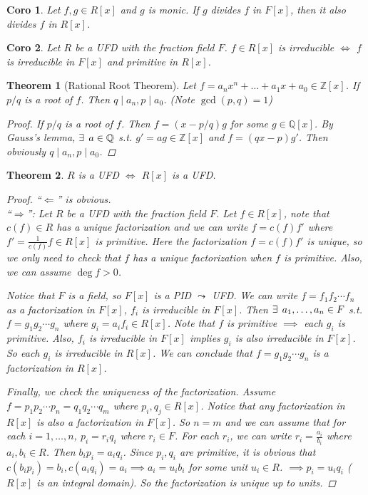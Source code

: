 \documentclass[a4paper]{article}
\let\existstemp\exists
\renewcommand*{\exists}{\existstemp\mkern4mu}
\newcommand{\Zb}{\mathbb{Z}}
\newcommand{\Qb}{\mathbb{Q}}
\theoremstyle{mystyle}
\newtheorem{theorem}{Theorem}
\newtheorem{coro}{Coro}
\begin{document}
\begin{coro}
  Let $f, g \in R[x]$ and $g$ is monic. If $g$ divides $f$ in $F[x]$, then
  it also divides $f$ in $R[x]$.
\end{coro}

\begin{coro}
  Let $R$ be a UFD with the fraction field $F$. $f \in R[x]$
  is irreducible $\iff$ $f$ is irreducible in $F[x]$ and primitive in $R[x]$.
\end{coro}

\begin{theorem}[Rational Root Theorem]
  Let $f = a_n x^n + \dots + a_1 x + a_0 \in \Zb[x]$.
  If $p/q$ is a root of $f$. Then $q \mid a_n, p \mid a_0$.
  (Note $\gcd(p, q) = 1$)
  \begin{proof}
    If $p/q$ is a root of $f$. Then $f = (x - p/q)g$ for some $g \in \Qb[x]$.
    By Gauss's lemma, $\exists a \in \Qb$ s.t. $g' = ag \in \Zb[x]$ and
    $f = (qx - p)g'$. Then obviously $q \mid a_n, p \mid a_0$.
  \end{proof}
\end{theorem}

\begin{theorem}
  $R$ is a UFD $\iff$ $R[x]$ is a UFD.
  \begin{proof}
    ``$\Leftarrow$'' is obvious. \\
    ``$\Rightarrow$'': Let $R$ be a UFD with the fraction field $F$.
    Let $f \in R[x]$, note that $c(f) \in R$ has a unique factorization
    and we can write $f = c(f) f'$ where $f' = \frac{1}{c(f)} f \in R[x]$
    is primitive. Here the factorization $f = c(f) f'$ is unique, so we only
    need to check that $f$ has a unique factorization when $f$ is primitive.
    Also, we can assume $\deg f > 0$.

    Notice that $F$ is a field, so $F[x]$ is a PID $\leadsto$ UFD.
    We can write $f = f_1f_2\dotsm f_n$ as a factorization in $F[x]$,
    $f_i$ is irreducible in $F[x]$.
    Then $\exists a_1, \dots, a_n \in F$ s.t.
    $f = g_1 g_2 \dotsm g_n$ where $g_i = a_if_i \in R[x]$.
    Note that $f$ is primitive $\implies$ each $g_i$ is primitive.
    Also, $f_i$ is irreducible in $F[x]$ implies $g_i$ is also irreducible in $F[x]$.
    So each $g_i$ is irreducible in $R[x]$.  We can conclude that 
    $f = g_1 g_2 \dotsm g_n$ is a factorization in $R[x]$.

    Finally, we check the uniqueness of the factorization. Assume
    $f = p_1p_2 \dotsm p_n = q_1q_2 \dotsm q_m$ where $p_i, q_j \in R[x]$.
    Notice that any factorization in $R[x]$ is also a factorization in $F[x]$.
    So $n = m$ and we can assume that for each $i = 1,\dots, n$,
    $p_i = r_i q_i$ where $r_i \in F$. For each $r_i$, we can write
    $r_i = \frac{a_i}{b_i}$ where $a_i, b_i \in R$. Then $b_i p_i = a_i q_i$.
    Since $p_i, q_i$ are primitive, it is obvious that
    $c(b_i p_i) = b_i, c(a_i q_i) = a_i \implies a_i = u_ib_i$ for some unit
    $u_i \in R$.  $\implies p_i = u_i q_i$ ($R[x]$ is an integral domain).
    So the factorization is unique up to units.
  \end{proof}
\end{theorem}
\end{document}
